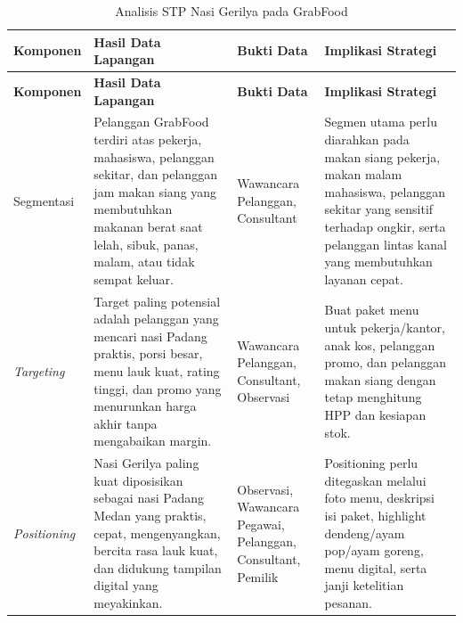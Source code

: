 \begingroup
    \footnotesize
    \begin{xltabular}{\textwidth}{|Z{1.75cm}|Y|L{2.05cm}|Y|}
        \caption{Analisis STP Nasi Gerilya pada GrabFood}
        \label{tab:analisis-stp-bab4}\\
        \toprule
        \textbf{Komponen} & \textbf{Hasil Data Lapangan} & \textbf{Bukti Data} & \textbf{Implikasi Strategi} \\ \hline
        \midrule
        \endfirsthead
        \toprule
        \textbf{Komponen} & \textbf{Hasil Data Lapangan} & \textbf{Bukti Data} & \textbf{Implikasi Strategi} \\ \hline
        \midrule
        \endhead
        \endfoot
        \bottomrule
        \endlastfoot
        Segmentasi & Pelanggan GrabFood terdiri atas pekerja, mahasiswa, pelanggan sekitar, dan pelanggan jam makan siang yang membutuhkan makanan berat saat lelah, sibuk, panas, malam, atau tidak sempat keluar. & Wawancara Pelanggan, Consultant & Segmen utama perlu diarahkan pada makan siang pekerja, makan malam mahasiswa, pelanggan sekitar yang sensitif terhadap ongkir, serta pelanggan lintas kanal yang membutuhkan layanan cepat. \\ \hline
        \textit{Targeting} & Target paling potensial adalah pelanggan yang mencari nasi Padang praktis, porsi besar, menu lauk kuat, rating tinggi, dan promo yang menurunkan harga akhir tanpa mengabaikan margin. & Wawancara Pelanggan, Consultant, Observasi & Buat paket menu untuk pekerja/kantor, anak kos, pelanggan promo, dan pelanggan makan siang dengan tetap menghitung HPP dan kesiapan stok. \\ \hline
        \textit{Positioning} & Nasi Gerilya paling kuat diposisikan sebagai nasi Padang Medan yang praktis, cepat, mengenyangkan, bercita rasa lauk kuat, dan didukung tampilan digital yang meyakinkan. & Observasi, Wawancara Pegawai, Pelanggan, Consultant, Pemilik & Positioning perlu ditegaskan melalui foto menu, deskripsi isi paket, highlight dendeng/ayam pop/ayam goreng, menu digital, serta janji ketelitian pesanan. \\ \hline
    \end{xltabular}
\endgroup


